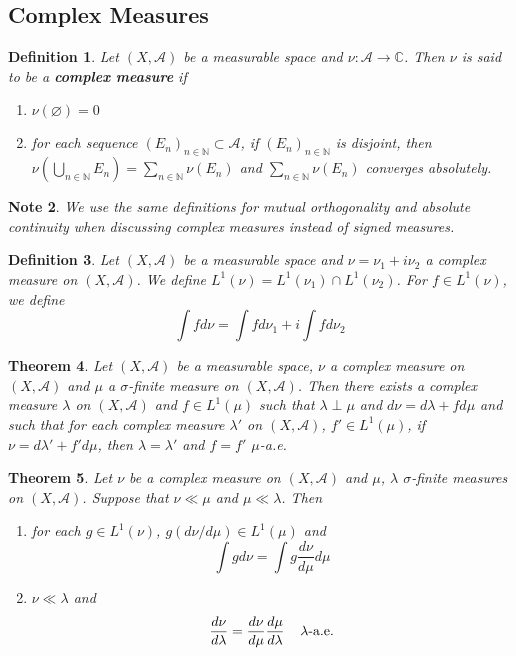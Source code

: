 \documentclass[12pt]{amsart}
\newtheorem{thm}{Theorem}[section]
\newtheorem{defn}[thm]{Definition}
\newtheorem{note}[thm]{Note}
\newcommand{\lam}{\lambda}
\newcommand{\sig}{\sigma}
\newcommand{\C}{\mathbb{C}}
\newcommand{\N}{\mathbb{N}}
\newcommand{\MA}{\mathcal{A}}
\begin{document}
\subsection{Complex Measures}

\begin{defn}
Let $(X, \MA)$ be a measurable space and $\nu:\MA \rightarrow \C$. Then $\nu$ is said to be a \textbf{complex measure} if 
\begin{enumerate}
\item $\nu (\varnothing) = 0$
\item for each sequence $(E_n)_{n \in \N} \subset \MA$, if $(E_n)_{n \in \N}$ is disjoint, then $\nu(\bigcup_{n \in \N} E_n) = \sum_{n \in \N} \nu(E_n)$ and $\sum_{n \in \N} \nu(E_n)$ converges absolutely. 
\end{enumerate}
\end{defn}

\begin{note}
We use the same definitions for mutual orthogonality and absolute continuity when discussing complex measures instead of signed measures.
\end{note}

\begin{defn}
Let $(X,\MA)$ be a measurable space and $\nu = \nu_1 + i\nu_2$ a complex measure on $(X,\MA)$. We define $L^1(\nu) = L^1(\nu_1)\cap L^1(\nu_2)$. For $f \in L^1(\nu)$, we define $$\int f d\nu = \int fd\nu_1 + i \int f d \nu_2$$
\end{defn}

\begin{thm}
Let $(X,\MA)$ be a measurable space, $\nu$ a complex measure on $(X, \MA)$ and $\mu$ a $\sig$-finite measure on $(X, \MA)$. Then there exists a  complex measure $\lambda$ on $(X, \MA)$ and $f \in L^1(\mu)$ such that $\lam \perp \mu$ and $d \nu = d \lam + f d\mu$ and such that for each complex measure $\lam '$ on $(X, \MA)$, $f' \in L^1(\mu)$, if $\nu = d \lam '+ f'd \mu$, then $\lam = \lam '$ and $f = f'$  $\mu$-a.e.
\end{thm}

\begin{thm}
Let $\nu$ be a complex measure on $(X, \MA)$ and $\mu$, $\lam$ $\sig$-finite measures on $(X,\MA)$. Suppose that $\nu \ll \mu$ and $\mu \ll \lam$. Then 
\begin{enumerate}
\item for each $g \in L^1(\nu)$, $g(d\nu/d\mu) \in  L^1(\mu)$ and $$\int g d\nu = \int g \frac{d\nu}{d\mu} d\mu$$
\item $\nu \ll \lam$ and $$\frac{d \nu}{d\lam} = \frac{d \nu}{d\mu} \frac{d\mu}{d\lam} \hspace{4mm} \lam \text{-a.e.}$$
\end{enumerate}
\end{thm}
\end{document}
